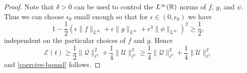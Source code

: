\begin{proof}
	Note that \(\delta>0\) can be used to control the \(L^\infty(\mathbb{R})\) norms of \(f\), \(g\), and \(\psi\). Thus we can choose \(\epsilon_0\) small enough so that for \(\epsilon \in (0,\epsilon_0)\) we have 
	\begin{equation}
		1 - \frac 12 \left( \epsilon \| f\|_{L^\infty} + \epsilon \|g\|_{L^\infty} + \epsilon^3 \| \phi \|_{L^\infty} \right)^2 \geq \frac 12,
	\end{equation}
	independent on the particular choices of \(f\) and \(g\). 	Hence
	\begin{equation}
		\mathcal E(t) \geq \frac 1 2 \| \mathcal Q \|_{\ell^2}^2 + \frac 1 4 \| \mathcal U\|_{\ell^2}^2 \geq \frac 1 4\| \mathcal Q \|_{\ell^2}^2 + \frac 1 4 \| \mathcal U\|_{\ell^2}^2
	\end{equation}
	and \cref{coercive-bound} follows.
	

\end{proof}
